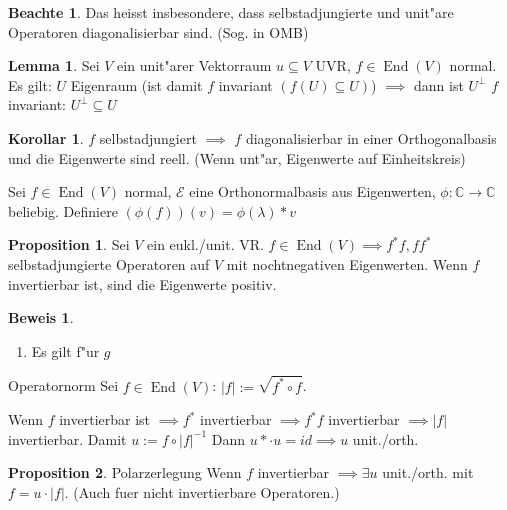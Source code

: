 \documentclass[oneside,fontsize=11pt,paper=a4,BCOR=0mm,DIV=12,automark,headsepline]{scrbook}
\DeclareMathOperator{\mEnd}{End}
\theoremstyle{remark}
\theoremstyle{definition}
\newtheorem*{notte}{Beachte}
\newtheorem*{proposition}{Proposition}
\newtheorem{lemma}{Lemma}[section]
\newtheorem*{korollar}{Korollar}
\theoremstyle{definition}
\newtheorem*{prof}{Beweis}
\theoremstyle{remark}
\begin{document}
\begin{notte}
  Das heisst insbesondere, dass selbstadjungierte und unit"are Operatoren
  diagonalisierbar sind. (Sog. in OMB)
\end{notte}
\begin{lemma}
  Sei $V$ ein unit"arer Vektorraum $u\subseteq V$ UVR, $f\in \mEnd (V)$ normal. Es
  gilt: $U$ Eigenraum (ist damit $f$ invariant $(f(U)\subseteq U) $) $\implies $ dann ist $U^\perp$
  $f$ invariant:
  $U^\perp\subseteq U$ 
\end{lemma}

\begin{korollar}
  $f$ selbstadjungiert $\implies$ $f$ diagonalisierbar in einer Orthogonalbasis
  und die Eigenwerte sind reell. (Wenn unt"ar, Eigenwerte auf Einheitskreis)
\end{korollar}
\begin{relation}
  Sei $f\in \mEnd (V)$ normal, $\mathcal{E}$ eine Orthonormalbasis aus Eigenwerten,
  $\phi: \mathbb{C} \rightarrow \mathbb{C}$ beliebig. Definiere $(\phi(f))(v)=\phi(\lambda)*v$
\end{relation}

\begin{proposition}
  Sei $V$ ein eukl./unit. VR. $f\in \mEnd (V) \implies f^* f, ff^*$
  selbstadjungierte Operatoren auf $V$ mit nochtnegativen Eigenwerten. Wenn $f$
  invertierbar ist, sind die Eigenwerte positiv.
\end{proposition}

\begin{prof}
  \begin{enumerate}
  \item Es gilt f"ur $g$
  \end{enumerate}
\end{prof}

\begin{definition}{Operatornorm}{}
  Sei $f\in \mEnd (V)$: $|f|:= \sqrt{f^*\circ f}$.
\end{definition}
\begin{relation}
  Wenn $f$ invertierbar ist $\implies f^*$ invertierbar $\implies f^* f$
  invertierbar $\implies |f| $ invertierbar.
  Damit $u:= f\circ |f|^{-1}$ Dann $u* \cdot u=id \implies u$ unit./orth.
\end{relation}

\begin{proposition}{Polarzerlegung}
  Wenn $f$ invertierbar $\implies \exists u$ unit./orth. mit $f=u\cdot |f|$.
  (Auch fuer nicht invertierbare Operatoren.)
\end{proposition}
\end{document}

